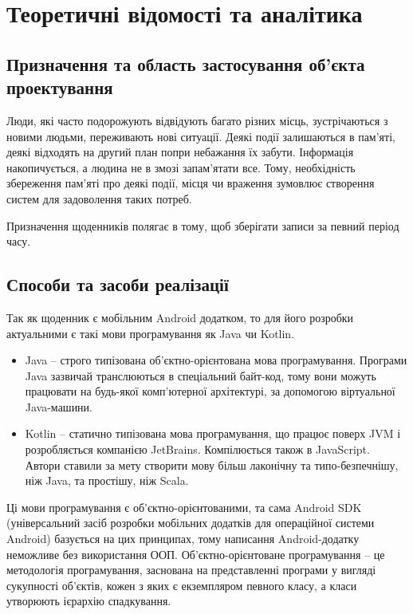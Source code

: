 \documentclass[../main.tex]{subfiles}
\begin{document}
\chapter{Теоретичні відомості та аналітика}

\section{Призначення та область застосування об'єкта проектування}

Люди, які часто подорожують відвідують багато різних місць, зустрічаються з новими людьми, переживають нові ситуації. Деякі події залишаються в пам'яті, деякі відходять на другий план попри небажання їх забути. Інформація накопичується, а людина не в змозі запам'ятати все. Тому, необхідність збереження пам'яті про деякі події, місця чи враження зумовлює створення систем для задоволення таких потреб.

Призначення щоденників полягає в тому, щоб зберігати записи за певний період часу. 

\section{Способи та засоби реалізації}

Так як щоденник є мобільним Android додатком, то для його розробки актуальними є такі мови програмування як Java чи Kotlin. 

\begin{itemize}
    \item Java – строго типізована об'єктно-орієнтована мова програмування. Програми Java зазвичай транслюються в спеціальний байт-код, тому вони можуть працювати на будь-якої комп'ютерної архітектурі, за допомогою віртуальної Java-машини.
    \item Kotlin – статично типізована мова програмування, що працює поверх JVM і розробляється компанією JetBrains. Компілюється також в JavaScript. Автори ставили за мету створити мову більш лаконічну та типо-безпечнішу, ніж Java, та простішу, ніж Scala.
\end{itemize}

Ці мови програмування є об'єктно-орієнтованими, та сама Android SDK (універсальний засіб розробки мобільних додатків для операційної системи Android) базується на цих принципах, тому написання Android-додатку неможливе без використання ООП. Об'єктно-орієнтоване програмування – це методологія програмування, заснована на представленні програми у вигляді сукупності об'єктів, кожен з яких є екземпляром певного класу, а класи утворюють ієрархію спадкування.
\end{document}
